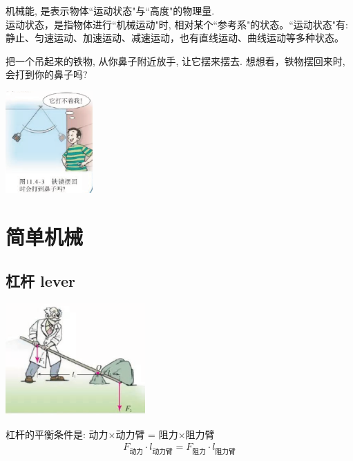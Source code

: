 \documentclass[UTF8]{ctexart}
\begin{document}
	机械能, 是表示物体``运动状态"与``高度"的物理量. \\
	运动状态，是指物体进行``机械运动"时, 相对某个``参考系"的状态。``运动状态"有: 静止、匀速运动、加速运动、减速运动，也有直线运动、曲线运动等多种状态。 \\
	
	
	
	\begin{tcolorbox}[title = {例},boxrule={0.1em},colframe={black!10}, colback={black!3},colbacktitle={black!10},coltitle={black}]
把一个吊起来的铁物, 从你鼻子附近放手, 让它摆来摆去. 想想看，铁物摆回来时, 会打到你的鼻子吗?

\includegraphics[width=0.25\textwidth]{img/0047.png}
	\end{tcolorbox}
	
	
	
	
	\section{简单机械}






	
	\subsection{杠杆 lever}
	
	\includegraphics[width=0.4\textwidth]{img/0048.png}
	
	
	杠杆的平衡条件是: 动力×动力臂 = 阻力×阻力臂	
	\begin{align}
		\boxed{
			F_{\text{动力}}\cdot l_{\text{动力臂}}=F_{\text{阻力}}\cdot l_{\text{阻力臂}}			
		}
	\end{align}
	
\end{document}
